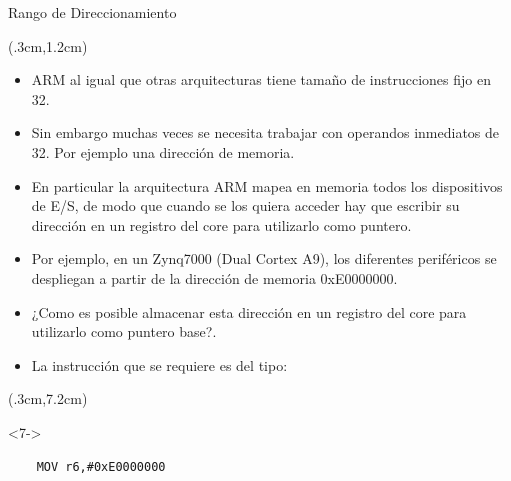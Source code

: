 \documentclass[usenames,table,dvipsnames,aspectratio=169]{beamer}
\begin{document}
\begin{frame}[fragile]{Rango de Direccionamiento}
 \begin{textblock*}{\textwidth}(.3cm,1.2cm)
  \begin{itemize}[<+(1)->]
   \justifying
   \item ARM al igual que otras arquitecturas tiene tamaño de instrucciones fijo en \SI{32}{\bit}.
   \item Sin embargo muchas veces se necesita trabajar con operandos inmediatos de \SI{32}{\bit}. Por ejemplo una dirección de memoria.
   \item En particular la arquitectura ARM mapea en memoria todos los dispositivos de E/S, de modo que cuando se los quiera acceder hay que escribir su dirección en un registro del core para utilizarlo como puntero.
   \item Por ejemplo, en un Zynq7000 (Dual Cortex A9), los diferentes periféricos se despliegan a partir de la dirección de memoria 0xE0000000.
   \item ¿Como es posible almacenar esta dirección en un registro del core para utilizarlo como puntero base?.
   \item La instrucción que se requiere es del tipo:
  \end{itemize}
 \end{textblock*}
 \begin{textblock*}{\textwidth}(.3cm,7.2cm)
  \begin{onlyenv}<7->
   \begin{lstlisting}
    MOV r6,#0xE0000000
   \end{lstlisting}
  \end{onlyenv}
 \end{textblock*}
\end{frame}
\end{document}
